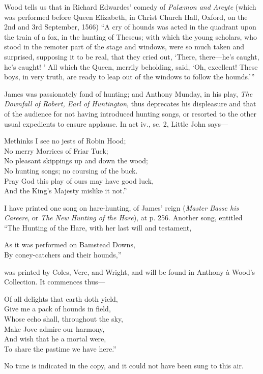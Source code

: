 Wood tells us that in Richard Edwardes’ comedy of \textit{Palæmon and Arcyte}
(which was performed before Queen Elizabeth, in Christ Church Hall, Oxford, on
the 2nd and 3rd September, 1566) “A cry of hounds was acted in the quadrant
upon the train of a fox, in the hunting of Theseus; with which the young
scholars, who stood in the remoter part of the stage and windows, were so much
taken and surprised, supposing it to be real, that they cried out, ‘There, there—he’s 
caught, he’s caught! ’ All which the Queen, merrily beholding, said,
‘Oh, excellent! These boys, in very truth, are ready to leap out of the windows
to follow the hounds.’”

James was passionately fond of hunting; and Anthony Munday, in his play,
\textit{The Downfall of Robert, Earl of Huntington}, thus deprecates his displeasure and
that of the audience for not having introduced hunting songs, or resorted to the
other usual expedients to ensure applause. In act iv., sc. 2, Little John says—
\settowidth{\versewidth}{No pleasant skippings up and down the wood;}
\begin{scverse}
\begin{altverse}
Methinks I see no jests of Robin Hood;\\
No merry Morrices of Friar Tuck;\\
No pleasant skippings up and down the wood;\\
No hunting songs; no coursing of the buck.\\
Pray God this play of ours may have good luck,\\
And the King’s Majesty mislike it not.”
\end{altverse}
\end{scverse}

I have printed one song on hare-hunting, of James’ reign (\textit{Master Basse his
Careere}, or \textit{The New Hunting of the Hare}), at p. 256. Another song, entitled
“The Hunting of the Hare, with her last will and testament,
\settowidth{\versewidth}{As it was performed on Bamstead Downs,}
\begin{scverse}
As it was performed on Bamstead Downs,\\
By coney-catchers and their hounds,”
\end{scverse}
was printed by Coles, Vere, and Wright, and will be found in Anthony à Wood’s
Collection. It commences thus—
\settowidth{\versewidth}{Whose echo shall, throughout the sky,}
\begin{scverse}
Of all delights that earth doth yield,\\
Give me a pack of hounds in field,\\
Whose echo shall, throughout the sky,\\
Make Jove admire our harmony,\\
And wish that he a mortal were,\\
To share the pastime we have here.”
\end{scverse}
No tune is indicated in the copy, and \pagebreak it could not have been sung to this air.

